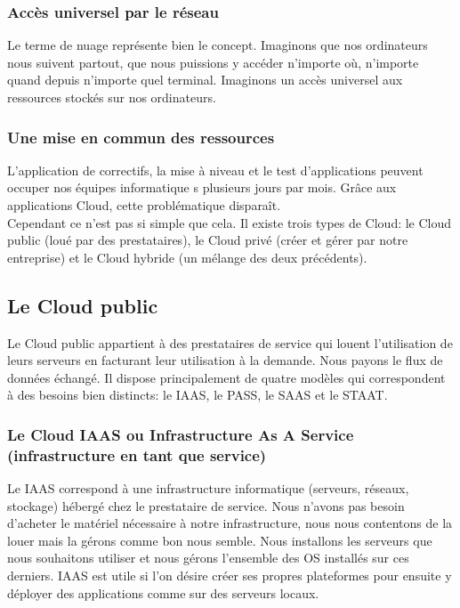 \documentclass{report}
\begin{document}
    \subsubsection{Accès universel par le réseau}
    Le terme de nuage représente bien le concept. Imaginons que nos ordinateurs nous suivent partout, que nous puissions y accéder n’importe où, n’importe quand depuis n’importe quel terminal. Imaginons un accès universel aux ressources stockés sur nos ordinateurs.

    \subsubsection{Une mise en commun des ressources}
    L'application de correctifs, la mise à niveau et le test d'applications peuvent occuper nos équipes informatique s plusieurs jours par mois. Grâce aux applications Cloud, cette problématique disparaît.\\

    Cependant ce n’est pas si simple que cela. Il existe trois types de Cloud: le Cloud public (loué par des prestataires), le Cloud privé (créer et gérer par notre entreprise) et le Cloud hybride (un mélange des deux précédents).

    \subsection{Le Cloud public}
    Le Cloud public appartient à des prestataires de service qui louent l’utilisation de leurs serveurs en facturant leur utilisation à la demande. Nous payons le flux de données échangé. Il dispose principalement de quatre modèles qui correspondent à des besoins bien distincts: le IAAS, le PASS, le SAAS et le STAAT.

      \subsubsection{Le Cloud IAAS ou Infrastructure As A Service (infrastructure en tant que service)}
      Le IAAS correspond à une infrastructure informatique (serveurs, réseaux, stockage) hébergé chez le prestataire de service. Nous n’avons pas besoin d’acheter le matériel nécessaire à notre infrastructure, nous nous contentons de la louer mais la gérons comme bon nous semble. Nous installons les serveurs que nous souhaitons utiliser et nous gérons l’ensemble des OS installés sur ces derniers. IAAS est utile si l’on désire créer ses propres plateformes pour ensuite y déployer des applications comme sur des serveurs locaux.
\end{document}
